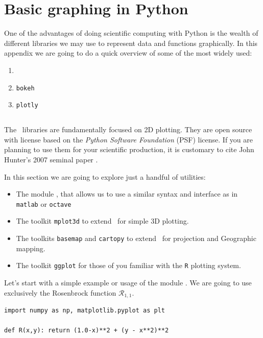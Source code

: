 
\chapter{Basic graphing in Python}\label{appendix:matplotlib}

One of the advantages of doing scientific computing with Python is the wealth of different libraries we may use to represent data and functions graphically.  In this appendix we are going to do a quick overview of some of the most widely used:

\begin{enumerate}
	\item \matplotlib
	\item \texttt{bokeh}
	\item \texttt{plotly}
\end{enumerate}

\section{\matplotlib}

The \matplotlib\ libraries are fundamentally focused on 2D plotting.  They are open source with license based on the \emph{Python Software Foundation} (PSF) license.  If you are planning to use them for your scientific production, it is customary to cite John Hunter's 2007 seminal paper \cite{Hunter:2007}.   

In this section we are going to explore just a handful of utilities:
\begin{itemize}
 	\item The module \pyplot, that allows us to use a similar syntax and interface as in \texttt{matlab} or \texttt{octave}
 	\item The toolkit \texttt{mplot3d} to extend \matplotlib\ for simple 3D plotting.
 	\item The toolkits \texttt{basemap} and \texttt{cartopy} to extend \matplotlib\ for projection and Geographic mapping.
 	\item The toolkit \texttt{ggplot} for those of you familiar with the \texttt{R} plotting system.
 \end{itemize} 

Let's start with a simple example or usage of the module \pyplot.  We are going to use exclusively the Rosenbrock function $\mathcal{R}_{1,1}$.

\begin{verbatim}
import numpy as np, matplotlib.pyplot as plt 

def R(x,y): return (1.0-x)**2 + (y - x**2)**2
\end{verbatim}

